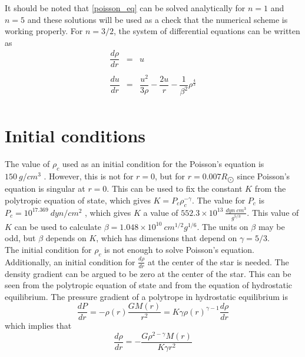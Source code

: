 \documentclass[11pt,letterpaper]{article}
\begin{document}
It should be noted that \eqref{poisson_eq} can be solved analytically for $n=1$
and $n=5$ and these solutions will be used as a check that the numerical scheme
is working properly. For $n = 3/2$, the system of differential equations can be
written as
\begin{equation}
    \begin{array}{rcl}
        \dfrac{d\rho}{dr} & = & u\\
        \ \\
        \dfrac{du}{dr} & = & \dfrac{u^2}{3\rho}
        -\dfrac{2u}{r} -\dfrac{1}{\beta^2} \rho^\frac{4}{3} \\
    \end{array}
    \label{poly32}
\end{equation}

\section{Initial conditions}

The value of $\rho_c$ used as an initial condition for the Poisson's equation is
$150\ g/cm^3$ \cite{textbook}. However, this is not for $r = 0$, but for
$r = 0.007 R_{\bigodot}$ since Poisson's equation is singular at $r = 0$. This
can be used to fix the constant $K$ from the polytropic equation of state, which
gives $K = P_c \rho_c^{-\gamma}$. The value for $P_c$ is
$P_c = 10^{17.369}\ dyn/cm^2$ \cite{textbook}, which gives $K$ a value of
$552.3 \times 10^{13}\ \frac{dyn\ cm^3}{g^{5/3}}$. This value of $K$ can be used
to calculate $\beta = 1.048 \times 10^{10}\ cm^{1/2} g^{1/6}$.
The units on $\beta$ may be odd, but $\beta$ depends on $K$, which has
dimensions that depend on $\gamma = 5/3$.\\

The initial condition for $\rho_c$ is not enough to solve Poisson's equation.
Additionally, an initial condition for $\frac{d\rho}{dr}$ at the center of the
star is needed. The density gradient can be argued to be zero at the center of
the star. This can be seen from the polytropic equation of state and from the
equation of hydrostatic equilibrium. The pressure gradient of a polytrope in
hydrostatic equilibrium is
\begin{equation}
    \frac{dP}{dr} =
    -\rho\left(r\right)\frac{GM\left(r\right)}{r^2} = 
    K\gamma \rho\left(r\right)^{\gamma-1} \frac{d\rho}{dr} 
\end{equation}
which implies that 
\begin{equation}
    \frac{d\rho}{dr} = -\frac{G\rho^{2-\gamma}M\left(r\right)}{K\gamma r^2}
\end{equation}
\end{document}
